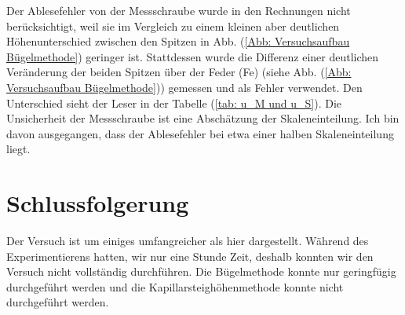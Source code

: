 \documentclass[bibliography=totocnumbered]{scrartcl}
\begin{document}
Der Ablesefehler von der Messschraube wurde in den Rechnungen nicht berücksichtigt, weil sie im Vergleich zu einem kleinen aber deutlichen Höhenunterschied zwischen den Spitzen in Abb. (\ref{Abb: Versuchsaufbau Bügelmethode}) geringer ist. Stattdessen wurde die Differenz einer deutlichen Veränderung der beiden Spitzen über der Feder (Fe) (siehe Abb. (\ref{Abb: Versuchsaufbau Bügelmethode})) gemessen und als Fehler verwendet. Den Unterschied sieht der Leser in der Tabelle (\ref{tab: u_M und u_S}). Die Unsicherheit der Messschraube ist eine Abschätzung der Skaleneinteilung. Ich bin davon ausgegangen, dass der Ablesefehler bei etwa einer halben Skaleneinteilung liegt.


	
	\section{Schlussfolgerung}
	
	Der Versuch ist um einiges umfangreicher als hier dargestellt. Während des Experimentierens hatten, wir nur eine Stunde Zeit, deshalb konnten wir den Versuch nicht vollständig durchführen. Die Bügelmethode konnte nur geringfügig durchgeführt werden und die Kapillarsteighöhenmethode konnte nicht durchgeführt werden.
	
	
	
\end{document}
